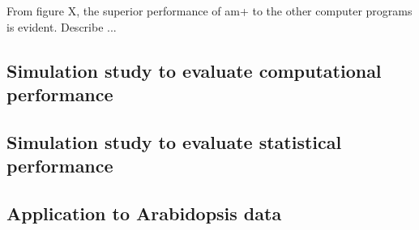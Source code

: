 \documentclass[12pt]{article}
\begin{document}
From figure X, the superior performance of am+ to the other computer programs is evident. Describe ...


\subsection{Simulation study to evaluate computational performance}

\subsection{Simulation study to evaluate statistical performance}

\subsection{Application to Arabidopsis data}
\end{document}
